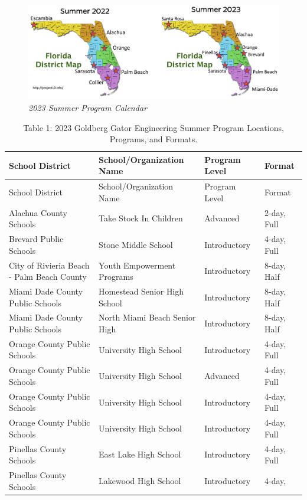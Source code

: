 \documentclass[
]{article}
\begin{document}
\begin{figure}
\centering
\includegraphics{Graphs/GGEE_23_FL District Map.jpg}
\caption{\emph{2023 Summer Program Calendar}}
\end{figure}

\begin{longtable}[]{@{}llll@{}}
\caption{Table 1: 2023 Goldberg Gator Engineering Summer Program
Locations, Programs, and Formats.}\tabularnewline
\toprule\noalign{}
School District & School/Organization Name & Program Level & Format \\
\midrule\noalign{}
\endfirsthead
\toprule\noalign{}
School District & School/Organization Name & Program Level & Format \\
\midrule\noalign{}
\endhead
\bottomrule\noalign{}
\endlastfoot
Alachua County Schools & Take Stock In Children & Advanced & 2-day,
Full \\
Brevard Public Schools & Stone Middle School & Introductory & 4-day,
Full \\
City of Rivieria Beach - Palm Beach County & Youth Empowerment Programs
& Introductory & 8-day, Half \\
Miami Dade County Public Schools & Homestead Senior High School &
Introductory & 8-day, Half \\
Miami Dade County Public Schools & North Miami Beach Senior High &
Introductory & 8-day, Half \\
Orange County Public Schools & University High School & Introductory &
4-day, Full \\
Orange County Public Schools & University High School & Advanced &
4-day, Full \\
Orange County Public Schools & University High School & Introductory &
4-day, Full \\
Orange County Public Schools & University High School & Introductory &
4-day, Full \\
Pinellas County Schools & East Lake High School & Introductory & 4-day,
Full \\
Pinellas County Schools & Lakewood High School & Introductory & 4-day,

\end{longtable}
\end{document}
